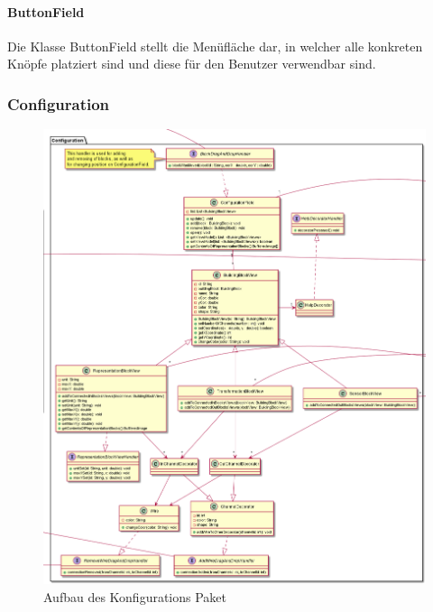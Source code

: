 \documentclass[parskip=full]{scrartcl}
\begin{document}
\paragraph{ButtonField}
Die Klasse ButtonField stellt die Menüfläche dar, in welcher alle konkreten Knöpfe platziert sind und diese für den Benutzer verwendbar sind.

\subsubsection{Configuration}

\begin{figure}[htbp]
	\begin{center}
		\includegraphics[width = 14cm]{Grafiken/ConfigurationNamespace.png}
		\caption{Aufbau des Konfigurations Paket}
		\label{Entwurf_Grob}
	\end{center}
\end{figure}
\end{document}
